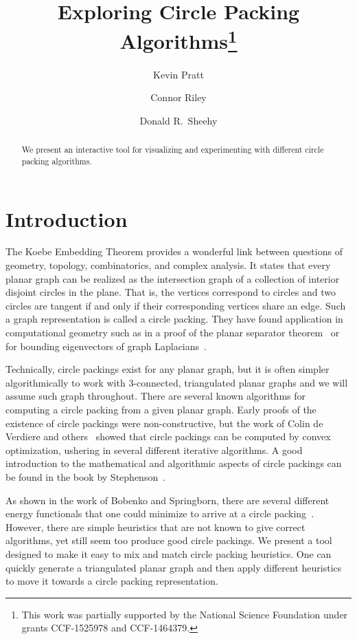 \documentclass[a4paper,UKenglish]{lipics}
\title{Exploring Circle Packing Algorithms\footnote{This work was partially supported by the National Science Foundation under grants CCF-1525978 and CCF-1464379.}}
\author[1]{Kevin Pratt}
\author[2]{Connor Riley}
\author[3]{Donald R.~Sheehy}
\affil[1]{University of Connecticut\\
  \texttt{kevin.pratt@uconn.edu}}
\affil[2]{University of Connecticut\\
  \texttt{connor.riley@uconn.edu}}
\affil[3]{University of Connecticut\\
  \texttt{don.r.sheehy@gmail.com}}
\begin{document}
\maketitle

\begin{abstract}
  We present an interactive tool for visualizing and experimenting with different circle packing algorithms.
\end{abstract}

\section{Introduction} %
\label{sec:introduction}

  The Koebe Embedding Theorem provides a wonderful link between questions of geometry, topology, combinatorics, and complex analysis.
  It states that every planar graph can be realized as the intersection graph of a collection of interior disjoint circles in the plane.
  That is, the vertices correspond to circles and two circles are tangent if and only if their corresponding vertices share an edge.
  Such a graph representation is called a circle packing.
  They have found application in computational geometry such as in a proof of the planar separator theorem~\cite{miller97separators} or for bounding eigenvectors of graph Laplacians~\cite{kelner06spectral}.
  
  Technically, circle packings exist for any planar graph, but it is often simpler algorithmically to work with $3$-connected, triangulated planar graphs and we will assume such graph throughout.
  There are several known algorithms for computing a circle packing from a given planar graph.
  Early proofs of the existence of circle packings were non-constructive, but the work of Colin de Verdiere\cite{colindeverdiere91principe} and others~\cite{mohar93polynomial,bobenko03variational} showed that circle packings can be computed by convex optimization, ushering in several different iterative algorithms.
  A good introduction to the mathematical and algorithmic aspects of circle packings can be found in the book by Stephenson~\cite{stephenson05introduction}.
  
  As shown in the work of Bobenko and Springborn, there are several different energy functionals that one could minimize to arrive at a circle packing~\cite{bobenko03variational}.
  However, there are simple heuristics that are not known to give correct algorithms, yet still seem too produce good circle packings. 
  We present a tool designed to make it easy to mix and match circle packing heuristics. 
  One can quickly generate a triangulated planar graph and then apply different heuristics to move it towards a circle packing representation.
  
\end{document}
